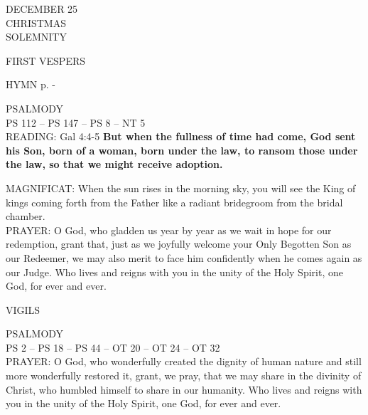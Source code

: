 \begin{center}\footnotesize DECEMBER 25\\
\normalsize CHRISTMAS\\
\footnotesize SOLEMNITY\end{center}

\begin{flushleft}\normalsize{\uppercase{FIRST VESPERS\\}}\end{flushleft}\label{christmas:nativity1stVespers}
\small{\uppercase{HYMN} p. \pageref{christmas:firstHymn}-\pageref{christmas:lastHymn}\\}

\noindent\small{\uppercase{PSALMODY}\\}
\uppercase{Ps 112 -- Ps 147 -- Ps 8 -- NT 5}\vspace{0.5em}\\
\noindent\small{\uppercase{READING:}}    Gal 4:4-5 \textbf{    But when the fullness of time had come, God sent his Son, born of a woman, born under the law, to ransom those under the law, so that we might receive adoption.\\}

\noindent\small{\uppercase{MAGNIFICAT:}}	When the sun rises in the morning sky, you will see the King of kings coming forth from the Father like a radiant bridegroom from the bridal chamber.\\

\noindent\small{\uppercase{PRAYER:}}	O God, who gladden us year by year as we wait in hope for our redemption, grant that, just as we joyfully welcome your Only Begotten Son as our Redeemer, we may also merit to face him confidently when he comes again as our Judge. Who lives and reigns with you in the unity of the Holy Spirit, one God, for ever and ever.

\begin{flushleft}\normalsize{\uppercase{VIGILS\\}}\end{flushleft}
\noindent\small{\uppercase{PSALMODY}\\}
\uppercase{Ps 2 -- Ps 18 -- Ps 44 -- OT 20 -- OT 24 -- OT 32}\vspace{0.5em}\\

\noindent\small{\uppercase{PRAYER:}}	O God, who wonderfully created the dignity of human nature and still more wonderfully restored it, grant, we pray, that we may share in the divinity of Christ, who humbled himself to share in our humanity. Who lives and reigns with you in the unity of the Holy Spirit, one God, for ever and ever.


